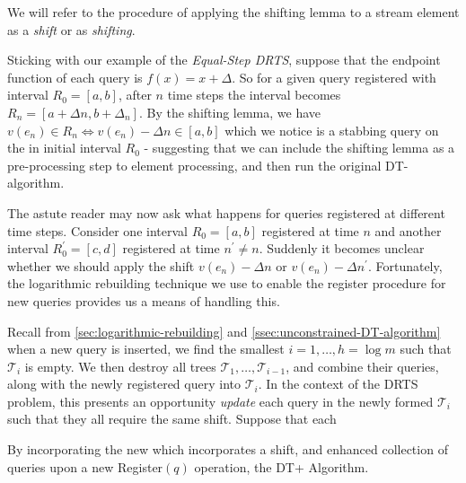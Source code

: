 We will refer to the procedure of applying the shifting lemma to a stream element as a \textit{shift} or as \textit{shifting}. 

Sticking with our example of the \textit{Equal-Step DRTS}, suppose that the endpoint function of each query is $f(x) = x+\Delta$. So for a given query registered with interval $R_0 = [a,b]$, after $n$ time steps the interval becomes $R_n = [a + \Delta n, b+\Delta_n]$. By the shifting lemma, we have $v(e_n) \in R_n \iff v(e_n) - \Delta n \in [a,b]$ which we notice is a stabbing query on the in initial interval $R_0$ - suggesting that we can include the shifting lemma as a pre-processing step to element processing, and then run the original DT-algorithm.

The astute reader may now ask what happens for queries registered at different time steps. Consider one interval $R_0 = [a, b]$ registered at time $n$ and another interval $R^\prime_0 = [c,d]$ registered at time $n^\prime \neq n$. Suddenly it becomes unclear whether we should apply the shift $v(e_n) - \Delta n$ or $v(e_n) - \Delta n^\prime$. Fortunately, the logarithmic rebuilding technique we use to enable the register procedure for new queries provides us a means of handling this.

Recall from \cref{sec:logarithmic-rebuilding} and \cref{ssec:unconstrained-DT-algorithm} when a new query is inserted, we find the smallest $i = 1,\dots,h=\log m$ such that $\mathcal{T}_i$ is empty. We then destroy all trees $\mathcal{T}_1,\dots,\mathcal{T}_{i-1}$, and combine their queries, along with the newly registered query into $\mathcal{T}_i$. In the context of the DRTS problem, this presents an opportunity \textit{update} each query in the newly formed $\mathcal{T}_i$ such that they all require the same shift. Suppose that each 

By incorporating the new which incorporates a shift, and enhanced collection of queries upon a new Register$(q)$ operation, the DT+ Algorithm. 